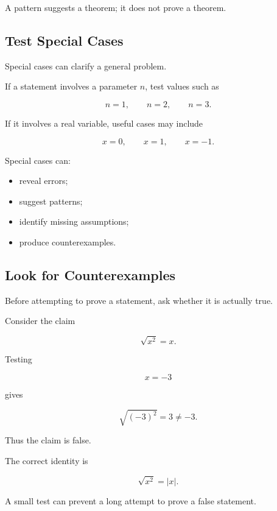 \begin{importantbox}
A pattern suggests a theorem; it does not prove a theorem.
\end{importantbox}

\subsection{Test Special Cases}
\label{subsec:test-special-cases}

Special cases can clarify a general problem.

If a statement involves a parameter \(n\), test values such as

\[ n=1,\qquad n=2,\qquad n=3. \]

If it involves a real variable, useful cases may include

\[ x=0,\qquad x=1,\qquad x=-1. \]

Special cases can:

\begin{itemize}
    \item reveal errors;
    \item suggest patterns;
    \item identify missing assumptions;
    \item produce counterexamples.
\end{itemize}

\subsection{Look for Counterexamples}
\label{subsec:look-counterexamples}

Before attempting to prove a statement, ask whether it is actually true.

Consider the claim

\[ \sqrt{x^2}=x. \]

Testing

\[ x=-3 \]

gives

\[ \sqrt{(-3)^2}=3\neq-3. \]

Thus the claim is false.

The correct identity is

\[ \sqrt{x^2}=|x|. \]

A small test can prevent a long attempt to prove a false statement.

